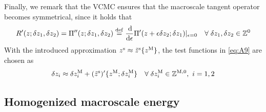 \documentclass{bmcart}
\newcommand{\eqtref}[1]{\eqref{#1}}
\begin{document}
Finally, we remark that the VCMC ensures that the macroscale tangent operator becomes symmetrical, since it holds that
\begin{align}
\label{eq:A9} R'(z;\delta z_1,\delta z_2) = \Pi''(z;\delta z_1,\delta z_2) \defeq \frac{\dif}{\dif\epsilon}\Pi'(z+\epsilon\delta z_2;\delta z_1)|_{\epsilon=0}\quad \forall\;\delta z_1,\delta z_2 \in \set Z^0
\end{align}
With the introduced approximation $z^{\mathrm{s}} \approx \tilde{z}^{\mathrm{s}}\{z^{\mathrm{M}}\}$, the test functions in \eqtref{eq:A9} are chosen as
\begin{align}
\label{eq:A10} \delta z_i \approx \delta z_i^\macro + (\tilde{z}^\fluct)'\{z^\macro;\delta z_i^\macro\} \quad \forall\;\delta z_i^\macro\in\set Z^{\macro,0}, \,\, i=1,2
\end{align}



\subsection{Homogenized macroscale energy}
\label{appendix:macroEnergy}
\end{document}
